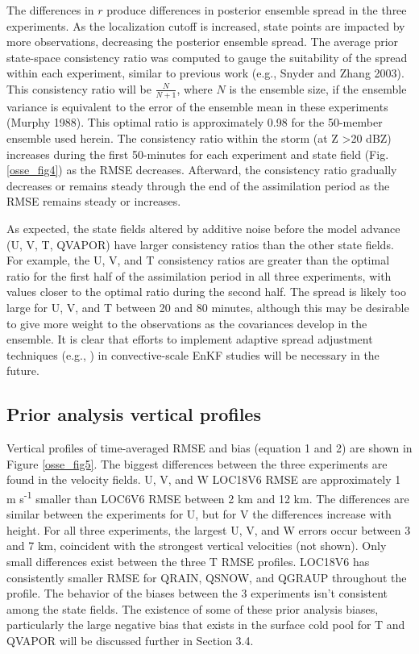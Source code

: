 The differences in \(r\) produce differences in posterior ensemble spread in the three experiments. As the localization cutoff is increased, state points are impacted by more observations, decreasing the posterior ensemble spread. The average prior state-space consistency ratio was computed to gauge the suitability of the spread within each experiment, similar to previous work (e.g., Snyder and Zhang 2003). This consistency ratio will be \(\frac{N}{N + 1}\), where \(N\) is the ensemble size, if the ensemble variance is equivalent to the error of the ensemble mean in these experiments (Murphy 1988). This optimal ratio is approximately 0.98 for the 50-member ensemble used herein. The consistency ratio within the storm (at Z \textgreater 20 dBZ) increases during the first 50-minutes for each experiment and state field (Fig. \ref{osse_fig4}) as the RMSE decreases. Afterward, the consistency ratio gradually decreases or remains steady through the end of the assimilation period as the RMSE remains steady or increases. 

As expected, the state fields altered by additive noise before the model advance (U, V, T, QVAPOR) have larger consistency ratios than the other state fields. For example, the U, V, and T consistency ratios are greater than the optimal ratio for the first half of the assimilation period in all three experiments, with values closer to the optimal ratio during the second half. The spread is likely too large for U, V, and T between 20 and 80 minutes, although this may be desirable to give more weight to the observations as the covariances develop in the ensemble. It is clear that efforts to implement adaptive spread adjustment techniques (e.g., \citealt{anderson09}) in convective-scale EnKF studies will be necessary in the future.

\subsection{Prior analysis vertical profiles}
Vertical profiles of time-averaged RMSE and bias (equation 1 and 2) are shown in Figure \ref{osse_fig5}. The biggest differences between the three experiments are found in the velocity fields. U, V, and W LOC18V6 RMSE are approximately 1 m s\textsuperscript{-1} smaller than LOC6V6 RMSE between 2 km and 12 km. The differences are similar between the experiments for U, but for V the differences increase with height. For all three experiments, the largest U, V, and W errors occur between 3 and 7 km, coincident with the strongest vertical velocities (not shown). Only small differences exist between the three T RMSE profiles. LOC18V6 has consistently smaller RMSE for QRAIN, QSNOW, and QGRAUP throughout the profile. The behavior of the biases between the 3 experiments isn't consistent among the state fields. The existence of some of these prior analysis biases, particularly the large negative bias that exists in the surface cold pool for T and QVAPOR will be discussed further in Section 3.4.

